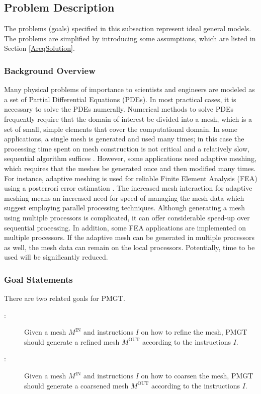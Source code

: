\documentclass[12pt,titlepage]{article}
\begin{document}
\subsection{Problem Description \label{AreqSecPD}}
The problems (goals) specified in this subsection represent ideal general models. The problems are simplified by introducing some assumptions, which are listed in Section \ref{AreqSolution}.

\subsubsection{Background Overview}
Many physical problems of importance to scientists and engineers are modeled as a set of Partial Differential Equations (PDEs). In most practical cases, it is necessary to solve the PDEs numerally. Numerical methods to solve PDEs frequently require that the domain of interest be divided into a mesh, which is a set of small, simple elements that cover the computational domain. In some applications, a single mesh is generated and used  many times; in this case the processing time spent on mesh construction is not critical and a relatively slow, sequential algorithm suffices \citep{Ruppert1993}. However, some applications need adaptive meshing, which requires that the meshes be generated once and then modified many times. For instance, adaptive meshing is used for reliable Finite Element Analysis (FEA) using a posterrori error estimation \citep{Zienkiewicz2005}. The increased mesh interaction for adaptive meshing means an increased need for speed of managing the mesh data which suggest employing parallel processing techniques. Although generating a mesh using multiple processors is complicated, it can offer considerable speed-up over sequential processing. In addition, some FEA applications are implemented on multiple processors. If the adaptive mesh can be generated in multiple processors as well, the mesh data can remain on the local processors. Potentially, time to be used will be significantly reduced. 

\subsubsection{Goal Statements}
There are two related goals for PMGT.
\begin{description}
\item[\gthegoalnum \label{gRefining}:] Given a mesh $M^{\mbox{IN}}$ and instructions $I$ on how to refine the mesh, PMGT should generate a refined mesh $M^{\mbox{OUT}}$ according to the instructions $I$.
\item[\gthegoalnum \label{gCoarsening}:]Given a mesh $M^{\mbox{IN}}$ and instructions $I$ on how to coarsen the mesh, PMGT should generate a coarsened mesh $M^{\mbox{OUT}}$ according to the instructions $I$.
\end{description}
\end{document}
